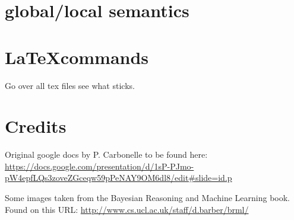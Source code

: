 \documentclass[a4paper,10pt]{article}
\begin{document}
\section{global/local semantics}


















































\appendix


\section{\LaTeX commands}
Go over all tex files see what sticks.
\section{Credits}


Original google docs by P. Carbonelle to be found here:\\ \url{https://docs.google.com/presentation/d/1sP-PJmo-pW4epfLQs3zoveZGceqw59pPeNAY9OM6dl8/edit#slide=id.p}

Some images taken from the Bayesian Reasoning and Machine Learning book. Found on this URL: \url{http://www.cs.ucl.ac.uk/staff/d.barber/brml/}













\end{document}

